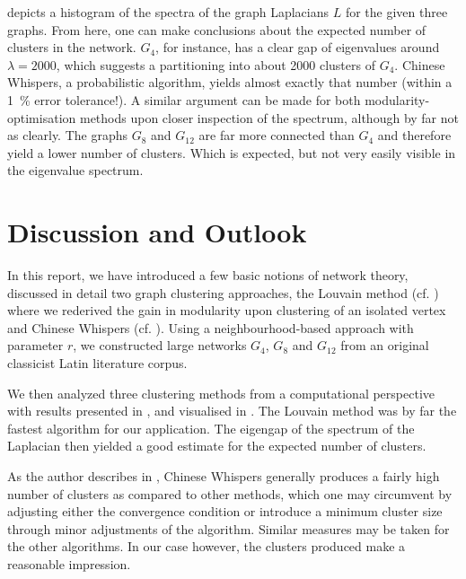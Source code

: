 \documentclass[12pt, a4paper]{article}
\begin{document}
   depicts a histogram of the spectra of the graph Laplacians $L$ for the given three graphs.
  From here, one can make conclusions about the expected number of clusters in the network. $G_4$, for instance, has a clear gap of eigenvalues around $\lambda = 2000$, which suggests a partitioning into about 2000 clusters of $G_4$. Chinese Whispers, a probabilistic algorithm, yields almost exactly that number (within a \SI{1}{\percent} error tolerance!).
  A similar argument can be made for both modularity-optimisation methods upon closer inspection of the spectrum, although by far not as clearly.
  The graphs $G_8$ and $G_{12}$ are far more connected than $G_4$ and therefore yield a lower number of clusters.
  Which is expected, but not very easily visible in the eigenvalue spectrum.

  \pagebreak
  \section{Discussion and Outlook}
  In this report, we have introduced a few basic notions of network theory, discussed in detail two graph clustering approaches, the Louvain method (cf. ) where we rederived the gain in modularity upon clustering of an isolated vertex and Chinese Whispers (cf. ).
  Using a neighbourhood-based approach with parameter $r$, we constructed large networks $G_4$, $G_8$ and $G_{12}$ from an original classicist Latin literature corpus.

  We then analyzed three clustering methods from a computational perspective with results presented in ,  and visualised in .
  The Louvain method was by far the fastest algorithm for our application.
  The eigengap of the spectrum of the Laplacian then yielded a good estimate for the expected number of clusters.

  As the author describes in \cite{cw-biemann}, Chinese Whispers generally produces a fairly high number of clusters as compared to other methods, which one may circumvent by adjusting either the convergence condition or introduce a minimum cluster size through minor adjustments of the algorithm.
  Similar measures may be taken for the other algorithms.
  In our case however, the clusters produced make a reasonable impression.

  \pagebreak
  \printbibliography
\end{document}
